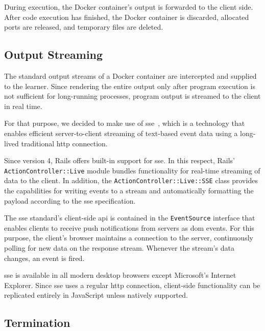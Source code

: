 During execution, the Docker container's output is forwarded to the client side. After code execution has finished, the Docker container is discarded, allocated ports are released, and temporary files are deleted.

\subsection{Output Streaming}

The standard output streams of a Docker container are intercepted and supplied to the learner. Since rendering the entire output only after program execution is not sufficient for long-running processes, program output is streamed to the client in real time.

For that purpose, we decided to make use of \gls{sse}~\cite{grigorik2013high}, which is a technology that enables efficient server-to-client streaming of text-based event data using a long-lived traditional \gls{http} connection.

Since version 4, Rails offers built-in support for \gls{sse}. In this respect, Rails' \texttt{ActionController::Live} module bundles functionality for real-time streaming of data to the client. In addition, the \texttt{ActionController::Live::SSE} class provides the capabilities for writing events to a stream and automatically formatting the payload according to the \gls{sse} specification.

The \gls{sse} standard's client-side \gls{api} is contained in the \texttt{EventSource} interface that enables clients to receive push notifications from servers as \gls{dom} events. For this purpose, the client's browser maintains a connection to the server, continuously polling for new data on the response stream. Whenever the stream's data changes, an event is fired.

\Gls{sse} is available in all modern desktop browsers except Microsoft's Internet Explorer. Since \gls{sse} uses a regular \gls{http} connection, client-side functionality can be replicated entirely in JavaScript unless natively supported.

\subsection{Termination}

